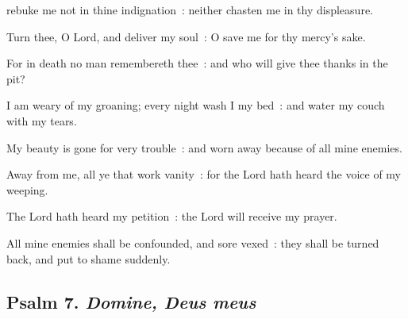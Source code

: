 rebuke me not in thine indignation~: neither chasten me in thy displeasure.\par
{}
Turn thee, O Lord, and deliver my soul~: O save me for thy mercy's sake.\par
{}For in death no man remembereth thee~: and who will give thee thanks in the pit?\par
{}I am weary of my groaning; every night wash I my bed~: and water my couch with my tears.\par
{}My beauty is gone for very trouble~: and worn away because of all mine enemies.\par
{}Away from me, all ye that work vanity~: for the Lord hath heard the voice of my weeping.\par
{}The Lord hath heard my petition~: the Lord will receive my prayer.\par
{}All mine enemies shall be confounded, and sore vexed~: they shall be turned back, and put to shame suddenly.\par

\subsection{Psalm 7. \textit{Domine, Deus meus}}

